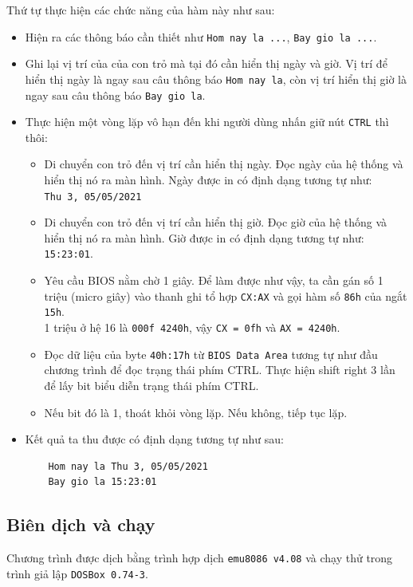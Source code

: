 \documentclass[12pt, final]{article}
\newcommand{\code}[1]{\texttt{#1}}
\begin{document}
Thứ tự thực hiện các chức năng của hàm này như sau:
\begin{itemize}
    \item Hiện ra các thông báo cần thiết như \code{Hom nay la ...}, \code{Bay gio la ...}.
    \item Ghi lại vị trí của của con trỏ mà tại đó cần hiển thị ngày và giờ. Vị trí để hiển thị ngày là ngay sau câu thông báo \code{Hom nay la}, còn vị trí hiển thị giờ là ngay sau câu thông báo \code{Bay gio la}.
    \item Thực hiện một vòng lặp vô hạn đến khi người dùng nhấn giữ nút \code{CTRL} thì thôi:
    \begin{itemize}
        \item Di chuyển con trỏ đến vị trí cần hiển thị ngày. Đọc ngày của hệ thống và hiển thị nó ra màn hình. Ngày được in có định dạng tương tự như: \\
        \code{Thu 3, 05/05/2021}
        \item Di chuyển con trỏ đến vị trí cần hiển thị giờ. Đọc giờ của hệ thống và hiển thị nó ra màn hình. Giờ được in có định dạng tương tự như: \\
        \code{15:23:01}.
        \item Yêu cầu BIOS nằm chờ 1 giây. Để làm được như vậy, ta cần gán số 1 triệu (micro giây) vào thanh ghi tổ hợp \code{CX:AX} và gọi hàm số \code{86h} của ngắt \code{15h}.\\ 1 triệu ở hệ 16 là \code{000f 4240h}, vậy \code{CX = 0fh} và \code{AX = 4240h}.
        \item Đọc dữ liệu của byte \code{40h:17h} từ \code{BIOS Data Area} tương tự như đầu chương trình để đọc trạng thái phím CTRL. Thực hiện shift right 3 lần để lấy bit biểu diễn trạng thái phím CTRL.
        \item Nếu bit đó là 1, thoát khỏi vòng lặp. Nếu không, tiếp tục lặp.
    \end{itemize}
    \item Kết quả ta thu được có định dạng tương tự như sau:
    \begin{verbatim}
    Hom nay la Thu 3, 05/05/2021
    Bay gio la 15:23:01
    \end{verbatim}
    
\end{itemize}

\subsection{Biên dịch và chạy}
Chương trình được dịch bằng trình hợp dịch \code{emu8086 v4.08} và chạy thử trong trình giả lập \code{DOSBox 0.74-3}.
\end{document}
